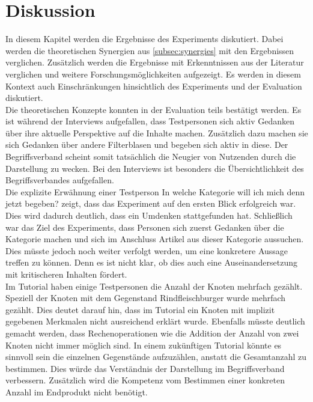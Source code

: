 \section{Diskussion}\label{sec:discussion}
In diesem Kapitel werden die Ergebnisse des Experiments diskutiert.
Dabei werden die theoretischen Synergien aus \autoref{subsec:synergies} mit den Ergebnissen verglichen.
Zusätzlich werden die Ergebnisse mit Erkenntnissen aus der Literatur verglichen und weitere Forschungsmöglichkeiten aufgezeigt.
Es werden in diesem Kontext auch Einschränkungen hinsichtlich des Experiments und der Evaluation diskutiert.\\

Die theoretischen Konzepte konnten in der Evaluation teils bestätigt werden.
Es ist während der Interviews aufgefallen, dass Testpersonen sich aktiv Gedanken über ihre aktuelle Perspektive auf die Inhalte machen.
Zusätzlich dazu machen sie sich Gedanken über andere Filterblasen und begeben sich aktiv in diese.
Der Begriffsverband scheint somit tatsächlich die Neugier von Nutzenden durch die Darstellung zu wecken.
Bei den Interviews ist besonders die Übersichtlichkeit des Begriffsverbandes aufgefallen. \\

Die explizite Erwähnung einer Testperson \glqq In welche Kategorie will ich mich denn jetzt begeben?\grqq{} zeigt, dass das Experiment auf den ersten Blick erfolgreich war.
Dies wird dadurch deutlich, dass ein Umdenken stattgefunden hat.
Schließlich war das Ziel des Experiments, dass Personen sich zuerst Gedanken über die Kategorie machen und sich im Anschluss Artikel aus dieser Kategorie aussuchen.
Dies müsste jedoch noch weiter verfolgt werden, um eine konkretere Aussage treffen zu können.
Denn es ist nicht klar, ob dies auch eine Auseinandersetzung mit kritischeren Inhalten fördert. \\

Im Tutorial haben einige Testpersonen die Anzahl der Knoten mehrfach gezählt.
Speziell der Knoten mit dem Gegenstand Rindfleischburger wurde mehrfach gezählt.
Dies deutet darauf hin, dass im Tutorial ein Knoten mit implizit gegebenen Merkmalen nicht ausreichend erklärt wurde.
Ebenfalls müsste deutlich gemacht werden, dass Rechenoperationen wie die Addition der Anzahl von zwei Knoten nicht immer möglich sind.
In einem zukünftigen Tutorial könnte es sinnvoll sein die einzelnen Gegenstände aufzuzählen, anstatt die Gesamtanzahl zu bestimmen.
Dies würde das Verständnis der Darstellung im Begriffsverband verbessern.
Zusätzlich wird die Kompetenz vom Bestimmen einer konkreten Anzahl im Endprodukt nicht benötigt. \\


